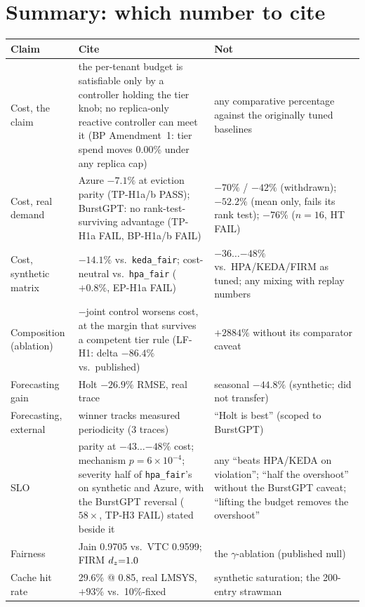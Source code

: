 \section{Summary: which number to cite}
\label{sec:eval-summary}

\begin{table}[htbp]
\centering\small
\begin{tabularx}{\textwidth}{@{}lXX@{}}
\toprule
\textbf{Claim} & \textbf{Cite} & \textbf{Not} \\
\midrule
Cost, the claim & the per-tenant budget is satisfiable only by a
controller holding the tier knob; no replica-only reactive controller can
meet it (BP Amendment~1: tier spend moves 0.00\% under any replica cap) &
any comparative percentage against the originally tuned baselines \\
Cost, real demand & Azure $-7.1\%$ at eviction parity (TP-H1a/b PASS);
BurstGPT: no rank-test-surviving advantage (TP-H1a FAIL, BP-H1a/b FAIL) &
$-70\%$ / $-42\%$ (withdrawn); $-52.2\%$ (mean only, fails its rank test);
$-76\%$ ($n{=}16$, HT FAIL) \\
Cost, synthetic matrix & $-14.1\%$ vs.\ \texttt{keda\_fair}; cost-neutral
vs.\ \texttt{hpa\_fair} ($+0.8\%$, EP-H1a FAIL) & $-36\ldots{-48\%}$ vs.\
HPA/KEDA/FIRM as tuned; any mixing with replay numbers \\
Composition (ablation) & $-$joint control worsens cost, at the margin that
survives a competent tier rule (LF-H1: delta $-86.4\%$ vs.\ published) &
$+2884\%$ without its comparator caveat \\
Forecasting gain & Holt $-26.9\%$ RMSE, real trace & seasonal $-44.8\%$
(synthetic; did not transfer) \\
Forecasting, external & winner tracks measured periodicity (3 traces) &
``Holt is best'' (scoped to BurstGPT) \\
SLO & parity at $-43\ldots{-48\%}$ cost; mechanism $p=6{\times}10^{-4}$;
severity half of \texttt{hpa\_fair}'s on synthetic and Azure, with the
BurstGPT reversal ($58\times$, TP-H3 FAIL) stated beside it & any ``beats
HPA/KEDA on violation''; ``half the overshoot'' without the BurstGPT
caveat; ``lifting the budget removes the overshoot'' \\
Fairness & Jain 0.9705 vs.\ VTC 0.9599; FIRM $d_z{=}1.0$ & the
$\gamma$-ablation (published null) \\
Cache hit rate & 29.6\% @ 0.85, real LMSYS, $+93\%$ vs.\ 10\%-fixed &
synthetic saturation; the 200-entry strawman \\

\end{tabularx}
\end{table}
